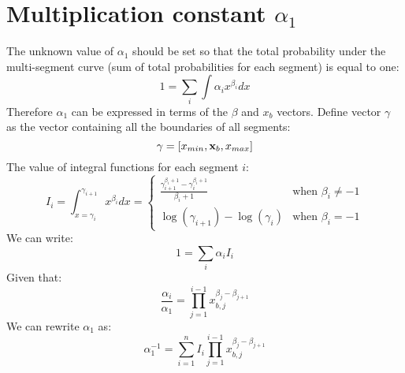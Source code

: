 \documentclass[a4 paper, 11  pt]{article}
\begin{document}
\section{Multiplication constant $\alpha_1$}

The unknown value of $\alpha_1$ should be set so that the total probability under the multi-segment curve (sum of total probabilities for each segment) is equal to one:
\begin{equation}
	1 = \sum_i \int \alpha_i x^{\beta_i} dx
\end{equation}
Therefore $\alpha_1$ can be expressed in terms of the $\beta$ and $x_b$ vectors. Define vector $\gamma$ as the vector containing all the boundaries of all segments:
\begin{equation}
	\gamma = [x_{min}, \vb{x}_b, x_{max}]
\end{equation}
The value of integral functions for each segment $i$:
\begin{equation}
	I_i = \int_{x=\gamma_i}^{\gamma_{i+1}} x^{\beta_i} dx
	=
	\begin{cases}
		\frac{\gamma_{i+1}^{\beta_i + 1} - \gamma_i^{\beta_i + 1}}{\beta_i + 1} &
		\text{when } \beta_i \neq -1 \\
		\log\left(\gamma_{i+1}\right) - \log\left(\gamma_i\right) &
		\text{when } \beta_i = -1
	\end{cases}
\end{equation}
We can write:
\begin{equation}
	1 = \sum_i \alpha_i I_i
\end{equation}
Given that:
\begin{equation}
	\frac{\alpha_i}{\alpha_1} = \prod_{j=1}^{i-1} x_{b,j}^{\beta_j - \beta_{j+1}}
\end{equation}
We can rewrite $\alpha_1$ as:
\begin{equation}
	\alpha_1^{-1} = \sum_{i=1}^{n} I_i \prod_{j=1}^{i-1} x_{b,j}^{\beta_j - \beta_{j+1}}
\end{equation}
\end{document}
